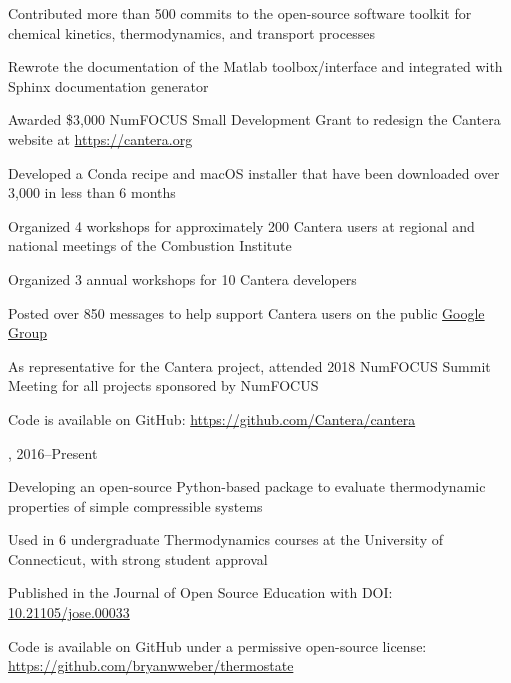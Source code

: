\begin{innerlist}
    \item Contributed more than 500 commits to the open-source software toolkit for chemical kinetics, thermodynamics, and transport processes
    \item Rewrote the documentation of the Matlab toolbox/interface and integrated with Sphinx documentation generator
    \item Awarded \$3,000 NumFOCUS Small Development Grant to redesign the Cantera website at \url{https://cantera.org}
    \item Developed a Conda recipe and macOS installer that have been downloaded over 3,000 in less than 6 months
    \item Organized 4 workshops for approximately 200 Cantera users at regional and national meetings of the Combustion Institute
    \item Organized 3 annual workshops for 10 Cantera developers
    \item Posted over 850 messages to help support Cantera users on the public \href{https://groups.google.com/forum/#!forum/cantera-users}{Google Group}
    \item As representative for the Cantera project, attended 2018 NumFOCUS Summit Meeting for all projects sponsored by NumFOCUS
    \item Code is available on GitHub: \url{https://github.com/Cantera/cantera}
\end{innerlist}

\vspace{\baselineskip}

,  \hfill 2016--Present

\begin{innerlist}
    \item Developing an open-source Python-based package to evaluate thermodynamic properties of simple compressible systems
    \item Used in 6 undergraduate Thermodynamics courses at the University of Connecticut, with strong student approval
    \item Published in the Journal of Open Source Education with DOI: \href{https://doi.org/10.21105/jose.00033}{10.21105/jose.00033}
    \item Code is available on GitHub under a permissive open-source license: \url{https://github.com/bryanwweber/thermostate}
\end{innerlist}

